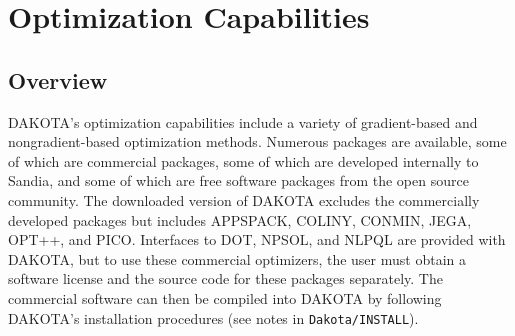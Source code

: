 \chapter{Optimization Capabilities}\label{opt}

\section{Overview}\label{opt:overview}

DAKOTA's optimization capabilities include a variety of gradient-based
and nongradient-based optimization methods. Numerous packages are
available, some of which are commercial packages, some of which are
developed internally to Sandia, and some of which are free software
packages from the open source community. The downloaded version of
DAKOTA excludes the commercially developed packages but includes
APPSPACK, COLINY, CONMIN, JEGA, OPT++, and PICO. Interfaces to DOT,
NPSOL, and NLPQL are provided with DAKOTA, but to use these commercial
optimizers, the user must obtain a software license and the source
code for these packages separately. The commercial software can then
be compiled into DAKOTA by following DAKOTA's installation procedures
(see notes in \texttt{Dakota/INSTALL}).

